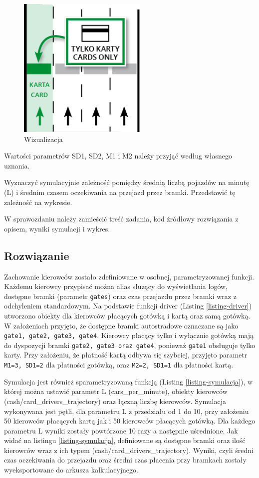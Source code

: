 \documentclass[a4paper,11pt,titlepage]{article}
\begin{document}
\begin{figure}[H]
 \centering
 \includegraphics[width=0.35\columnwidth]{img/tresc.PNG}
 \caption{Wizualizacja}
 \label{fig:wykres1}
\end{figure}

Wartości parametrów SD1, SD2, M1 i M2 należy przyjąć według własnego uznania.

Wyznaczyć symulacyjnie zależność pomiędzy średnią liczbą pojazdów na minutę (L) i średnim czasem oczekiwania na przejazd przez bramki. Przedstawić tę zależność na wykresie.

W sprawozdaniu należy zamieścić treść zadania, kod źródłowy rozwiązania z opisem, wyniki symulacji i wykres.


\subsection{Rozwiązanie}
Zachowanie kierowców zostało zdefiniowane w osobnej, parametryzowanej funkcji. Każdemu kierowcy przypisać można alias słuzący do wyświetlania logów, dostępne bramki (parametr \verb|gates|) oraz czas przejazdu przez bramki wraz z odchyleniem standardowym. Na podstawie funkcji driver  (Listing \ref{listing-driver}) utworzono obiekty dla kierowców płacących gotówką i kartą oraz samą gotówką. W założeniach przyjęto, że dostępne bramki autostradowe oznaczane są jako \verb|gate1, gate2, gate3, gate4|. Kierowcy płacący tylko i wyłącznie gotówką mają do dyspozycji bramki \verb|gate2, gate3 oraz gate4|, ponieważ \verb|gate1| obsługuje tylko karty. Przy założeniu, że płatność kartą odbywa się szybciej, przyjęto parametr \verb|M1=3, SD1=2| dla płatności gotówką, oraz \verb|M2=2, SD1=1| dla płatności kartą.

Symulacja jest również sparametryzowaną funkcją (Listing \ref{listing-symulacja}), w której można ustawić parametr L (cars\_per\_minute), obiekty kierowców (cash/card\_drivers\_trajectory) oraz łączną liczbę kierowców. Symulacja wykonywana jest pętli, dla parametru L z przedziału od 1 do 10, przy założeniu 50 kierowców płacących kartą jak i 50 kierowców płacących gotówką. Dla każdego parametru L wyniki zostały powtórzone 10 razy a następnie uśrednione. Jak widać na listingu \ref{listing-symulacja}, definiowane są dostępne bramki oraz ilość kierowców wraz z ich typem (cash/card\_drivers\_trajectory). Wyniki, czyli średni czas oczekiwania do przejazdu oraz średni czas płacenia przy bramkach zostały wyeksportowane do arkusza kalkulacyjnego.
\end{document}
